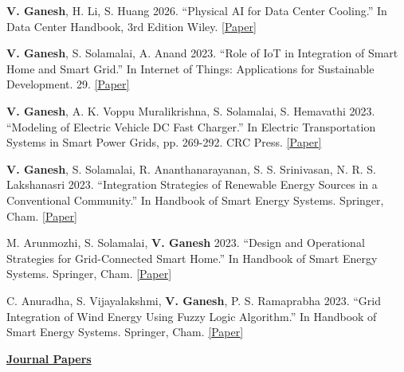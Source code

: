 \documentclass[]{Keval-resume}
\begin{document}
{{\begin{etaremune}
    \setlength{\itemsep}{0pt}
    \setlength{\parsep}{0pt}
    \item \textbf{V. Ganesh}, H. Li, S. Huang 2026. “Physical AI for Data Center Cooling.” In Data Center Handbook, 3rd Edition Wiley. \href{}{[{Paper}]}
    \item \textbf{V. Ganesh}, S. Solamalai, A. Anand 2023. “Role of IoT in Integration of Smart Home and Smart Grid.” In Internet of Things: Applications for Sustainable Development. 29. \href{https://www.taylorfrancis.com/chapters/edit/10.1201/9781003226888-3/role-iot-integration-smart-home-smart-grid-viswanathan-ganesh-senthilmurugan-solamalai-aswin-anand}{[{Paper}]} 
    \item \textbf{V. Ganesh}, A. K. Voppu Muralikrishna, S. Solamalai, S. Hemavathi 2023. “Modeling of Electric Vehicle DC Fast Charger.” In Electric Transportation Systems in Smart Power Grids, pp. 269-292. CRC Press. \href{https://www.taylorfrancis.com/chapters/edit/10.1201/9781003293989-10/modeling-electric-vehicle-dc-fast-charger-viswanathan-ganesh-ajay-krishna-senthilmurugan-hemavathi}{[Paper]}
    \item \textbf{V. Ganesh}, S. Solamalai, R. Ananthanarayanan, S. S. Srinivasan, N. R. S. Lakshanasri 2023. “Integration Strategies of Renewable Energy Sources in a Conventional Community.” In Handbook of Smart Energy Systems. Springer, Cham. \href{https://doi.org/10.1007/978-3-030-72322-4_120-1}{[{Paper}]} 
    \item M. Arunmozhi, S. Solamalai, \textbf{V. Ganesh} 2023. “Design and Operational Strategies for Grid-Connected Smart Home.” In Handbook of Smart Energy Systems. Springer, Cham. \href{https://link.springer.com/referenceworkentry/10.1007/978-3-030-72322-4_78-1}{[{Paper}]} 
    \item C. Anuradha, S. Vijayalakshmi, \textbf{V. Ganesh}, P. S. Ramaprabha 2023. “Grid Integration of Wind Energy Using Fuzzy Logic Algorithm.” In Handbook of Smart Energy Systems. Springer, Cham. \href{https://link.springer.com/content/pdf/10.1007/978-3-030-72322-4_180-1.pdf}{[{Paper}]} 
\end{etaremune}
\textbf{\underline{Journal Papers}} \\

}}
\end{document}
